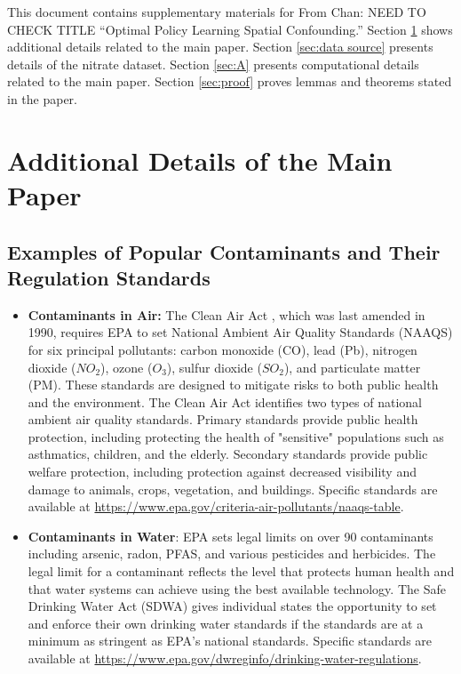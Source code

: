 \documentclass[12pt]{article}
\newcommand{\CP}[1]{{\color{purple}From Chan: #1}}
\begin{document}
This document contains supplementary materials for \CP{NEED TO CHECK TITLE ``Optimal Policy Learning Spatial Confounding.''} Section \ref{sec:additional_details} shows additional details related to the main paper. Section \ref{sec:data source} presents details of the nitrate dataset. Section \ref{sec:A} presents computational details related to the main paper. Section \ref{sec:proof} proves lemmas and theorems stated in the paper. 

\section{Additional Details of the Main Paper }\label{sec:additional_details}

\subsection{Examples of Popular Contaminants and Their Regulation Standards }\label{sec:other_threshold}

\begin{itemize}
    \item \textbf{Contaminants in Air:} The Clean Air Act \citep{popp2003pollution}, which was last amended in 1990, requires EPA to set National Ambient Air Quality Standards (NAAQS) \citep{bachmann2007will} for six principal pollutants:  carbon monoxide (CO), lead (Pb), nitrogen dioxide ($NO_2$), ozone ($O_3$), sulfur dioxide ($SO_2$), and particulate matter (PM). These standards are designed to mitigate risks to both public health and the environment. The Clean Air Act identifies two types of national ambient air quality standards. Primary standards provide public health protection, including protecting the health of "sensitive" populations such as asthmatics, children, and the elderly. Secondary standards provide public welfare protection, including protection against decreased visibility and damage to animals, crops, vegetation, and buildings. Specific standards are available at \url{https://www.epa.gov/criteria-air-pollutants/naaqs-table}.
    \item \textbf{Contaminants in Water}: EPA sets legal limits on over 90 contaminants including arsenic, radon, PFAS, and various pesticides and herbicides. The legal limit for a contaminant reflects the level that protects human health and that water systems can achieve using the best available technology. The Safe Drinking Water Act (SDWA) \citep{act1974safe} gives individual states the opportunity to set and enforce their own drinking water standards if the standards are at a minimum as stringent as EPA's national standards. Specific standards are available at \url{https://www.epa.gov/dwreginfo/drinking-water-regulations}.
\end{itemize}
\end{document}
